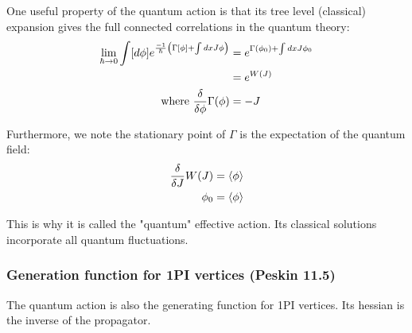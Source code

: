 \documentclass[11pt]{scrartcl}
\begin{document}
One useful property of the quantum action is that its tree level (classical) expansion gives the full connected correlations in the quantum  theory:
\begin{align}
\lim_{\hbar \rightarrow 0} \int [d\phi] e^{{-1 \over \hbar} \left(\Gamma[\phi] + \int dx J \phi \right)}  &= e^{\Gamma(\phi_0) + \int dx J \phi_0}  \\
 &= e^{W(J)} \\
\text{ where } {\delta \over \delta \phi} \Gamma(\phi) &= -J
\end{align}

Furthermore, we note the stationary point of $\Gamma$ is the expectation of the quantum field:
\begin{align}
{\delta \over \delta J} W(J) & = \braket{\phi} \\
\phi_0 & = \braket{\phi}
\end{align}

This is why it is called the "quantum" effective action.  Its classical solutions incorporate all quantum fluctuations.

\subsubsection{Generation function for 1PI vertices (Peskin 11.5)}

The quantum action is also the generating function for 1PI vertices.  Its hessian is the inverse of the propagator.
\end{document}
